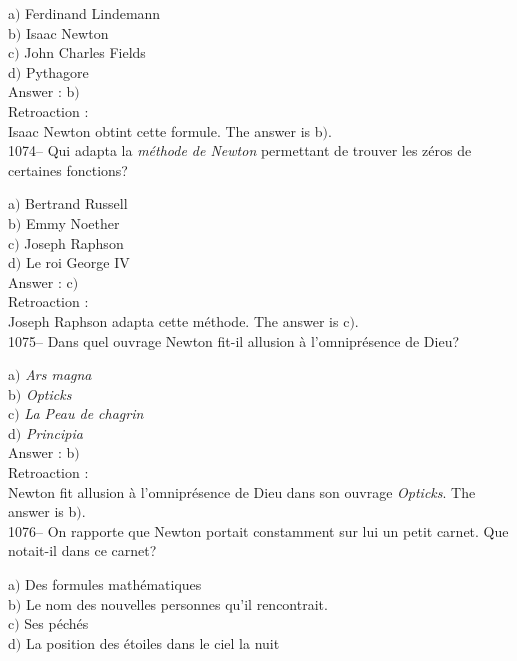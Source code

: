 ﻿\documentclass[letterpaper, 12pt]{article}
\begin{document}
a$)$ Ferdinand Lindemann \\
b$)$ Isaac Newton  \\
c$)$ John Charles Fields  \\
d$)$ Pythagore\\

Answer : b$)$\\

Retroaction : \\
Isaac Newton obtint cette formule.
The answer is b$)$.\\

1074-- Qui adapta la {\sl m\'ethode de Newton} permettant de trouver
les z\'eros de certaines fonctions?

a$)$ Bertrand Russell \\
b$)$ Emmy Noether  \\
c$)$ Joseph Raphson  \\
d$)$ Le roi George IV\\

Answer : c$)$\\

Retroaction : \\
Joseph Raphson adapta cette m\'ethode.
The answer is c$)$.\\

1075-- Dans quel ouvrage Newton fit-il allusion \`a l'omnipr\'esence
de Dieu?

a$)$ {\sl Ars magna} \\
b$)$ {\sl Opticks}  \\
c$)$ {\sl La Peau de chagrin}  \\
d$)$ {\sl Principia}\\

Answer : b$)$\\

Retroaction : \\
Newton fit allusion \`a l'omnipr\'esence de Dieu dans son ouvrage
{\sl Opticks}.
The answer is b$)$.\\

1076-- On rapporte que Newton portait constamment sur lui un petit
carnet. Que notait-il dans ce carnet?

a$)$ Des formules math\'ematiques \\
b$)$ Le nom des nouvelles personnes qu'il rencontrait.  \\
c$)$ Ses p\'ech\'es  \\
d$)$ La position des \'etoiles dans le ciel la nuit\\
\end{document}

